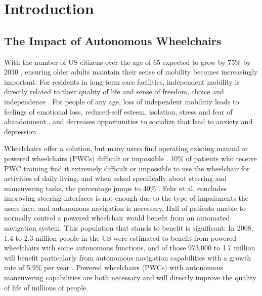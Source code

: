 


\chapter{Introduction}
\label{ch:Introduction}




\section{The Impact of Autonomous Wheelchairs}


With the number of US citizens over the age of 65 expected to grow by 75\% by
2030 \cite{simpson2008many}, ensuring older adults maintain their sense of
mobility becomes increasingly important.
For residents in long-term care facilities, independent mobility is directly
related to their quality of life and sense of freedom, choice and independence
\cite{bourret2002meaning}.
For people of any age, loss of independent mobilitiy leads to feelings of
emotional loss, reduced-self esteem, isolation, stress and fear of abandonment
\cite{finlayson2003experiencing}, and decreases opportunities to socialize that
lead to anxiety and depression \cite{iezzoni2001mobility}. 

Wheelchairs offer a solution, but many users find operating existing manual or
powered wheelchairs (PWCs) difficult or impossible \cite{simpson2008many}.
10\% of patients who receive PWC training find it extremely difficult or
impossible to use the wheelchair for activities of daily living, and
when asked specifically about steering and maneuvering tasks, the
percentage jumps to 40\% \cite{fehr2000adequacy}.
Fehr et al. \cite{fehr2000adequacy} concludes improving steering interfaces is
not enough due to the type of impairments the users face, and autonomous
navigation is necessary. Half of patients unable to normally control a powered
wheelchair would benefit from an automated navigation system.
This population that stands to benefit is significant:
In 2008, 1.4 to 2.3 million people in the US were estimated to
benefit from powered wheelchairs with some autonomous functions, and of those
973,000 to 1.7 million will benefit particularly from autonomous
navigation capabilities with a growth rate of 5.9\% per year \cite{simpson2008many}.
Powered wheelchairs (PWCs) with autonomous maneuvering capabilities are both
necessary and will directly improve the quality of life of millions of people.

